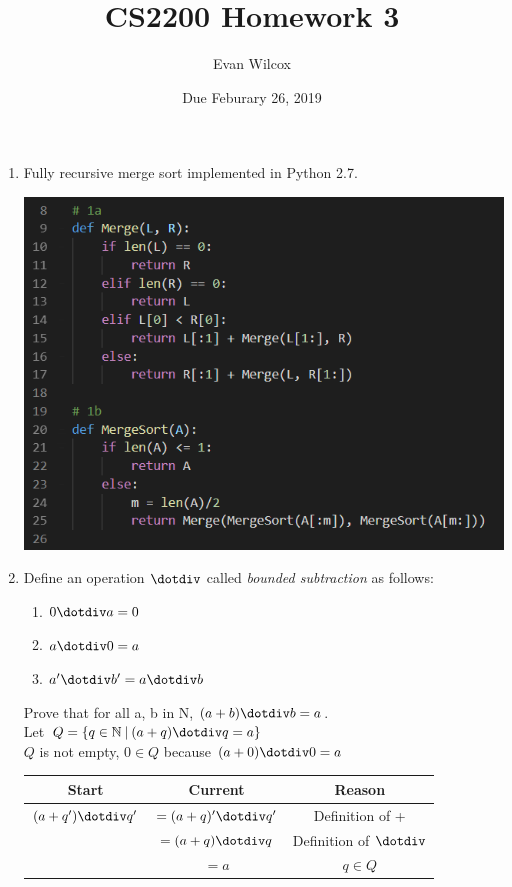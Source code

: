 \documentclass[a4paper]{article}
\title{CS2200 Homework 3}
\author{Evan Wilcox}
\date{Due Feburary 26, 2019}
\begin{document}
  \maketitle

  \begin{enumerate}

    \item Fully recursive merge sort implemented in Python 2.7. 
    
    \includegraphics[scale=0.7]{1} \\



    \newpage
    \item Define an operation $\dotdiv$ called \textit{bounded subtraction} as follows:

    \begin{enumerate}
      \item $0 \dotdiv a = 0$
      \item $a \dotdiv 0 = a$
      \item $a' \dotdiv b' = a \dotdiv b$
    \end{enumerate}

    Prove that for all a, b in N, $(a+b) \dotdiv b = a$. \\

    Let $Q = \{q \in \mathbb{N} \: | \: (a+q) \dotdiv q = a \}$ \\
    $Q$ is not empty, $0 \in Q$ because $(a+0) \dotdiv 0 = a $
    
    
    \begin{tabular}{ |c|c|c| } \hline
      Start               & Current              & Reason                  \\ \hline
      $(a+q') \dotdiv q'$ & $=(a+q)' \dotdiv q'$ & Definition of +         \\ \hline
                          & $=(a+q) \dotdiv q$   & Definition of $\dotdiv$ \\ \hline
                          & $=a$                 & $q \in Q$               \\ \hline


\end{tabular}
\end{enumerate}
\end{document}
